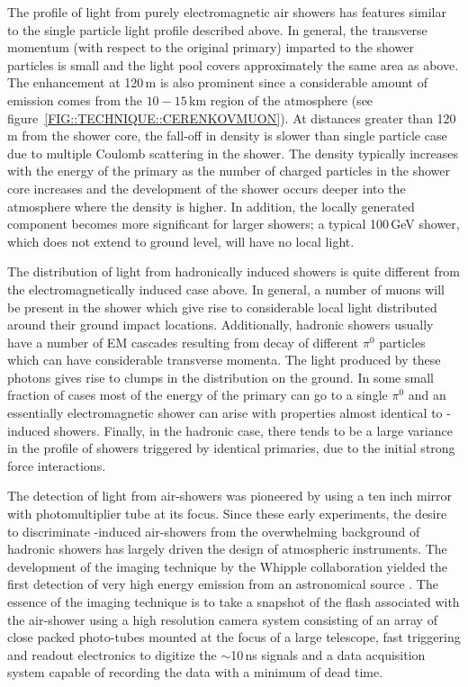 The profile of \Cerenkov light from purely electromagnetic air showers
has features similar to the single particle light profile described
above. In general, the transverse momentum (with respect to the
original primary) imparted to the shower particles is small and the
\Cerenkov light pool covers approximately the same area as above.  The
enhancement at 120\,m is also prominent since a considerable amount of
emission comes from the $10-15$\,km region of the atmosphere (see
figure~\ref{FIG::TECHNIQUE::CERENKOVMUON}). At distances greater than
120\,m from the shower core, the fall-off in \Cerenkov density is
slower than single particle case due to multiple Coulomb scattering in
the shower. The \Cerenkov density typically increases with the energy
of the primary as the number of charged particles in the shower core
increases and the development of the shower occurs deeper into the
atmosphere where the density is higher. In addition, the locally
generated \Cerenkov component becomes more significant for larger
showers; a typical 100\,GeV shower, which does not extend to ground
level, will have no local light.

The distribution of \Cerenkov light from hadronically induced showers
is quite different from the electromagnetically induced case above. In
general, a number of muons will be present in the shower which give
rise to considerable local light distributed around their ground
impact locations. Additionally, hadronic showers usually have a number
of EM cascades resulting from decay of different $\pi^0$ particles
which can have considerable transverse momenta. The \Cerenkov light
produced by these photons gives rise to clumps in the distribution on
the ground. In some small fraction of cases most of the energy of the
primary can go to a single $\pi^0$ and an essentially electromagnetic
shower can arise with properties almost identical to {\Grayc}-induced
showers. Finally, in the hadronic case, there tends to be a large
variance in the profile of showers triggered by identical primaries,
due to the initial strong force interactions.

The detection of \Cerenkov light from air-showers was pioneered by
\citet{REF::GALBRAITHJELLEY::1953, REF::GALBRAITHJELLEY::1955} using a
ten inch mirror with photomultiplier tube at its focus. Since these
early experiments, the desire to discriminate {\Grayc}-induced
air-showers from the overwhelming background of hadronic showers has
largely driven the design of atmospheric \Cerenkov instruments. The
development of the imaging technique by the Whipple collaboration
yielded the first detection of very high energy \Gray emission from an
astronomical source \citep{REF::WEEKES::APJ1989}. The essence of the
imaging technique is to take a snapshot of the \Cerenkov flash
associated with the air-shower using a high resolution camera system
consisting of an array of close packed photo-tubes mounted at the focus
of a large telescope, fast triggering and readout electronics to
digitize the $\sim$10\,ns signals and a data acquisition system capable
of recording the data with a minimum of dead time. 


